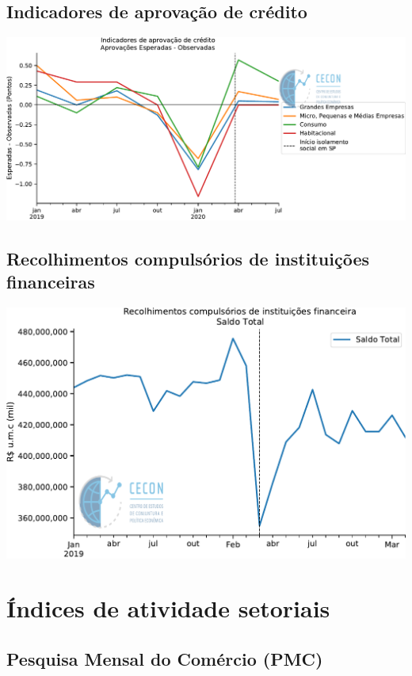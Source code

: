 \documentclass{SelfArx}
\begin{document}
\subsection*{Indicadores de aprovação de crédito}
\label{sec:org9c7ccd3}

\begin{center}
\includegraphics[width=.9\linewidth]{./figs/Credito/PTC.pdf}
\end{center}

\subsection*{Recolhimentos compulsórios de instituições financeiras}
\label{sec:org78a6926}

\begin{center}
\includegraphics[width=.9\linewidth]{./figs/Credito/Recolhimentos_Total.pdf}
\end{center}

\section*{Índices de atividade setoriais}
\label{sec:org6ae3902}


\subsection*{Pesquisa Mensal do Comércio (PMC)}
\label{sec:org404a3d1}
\end{document}
